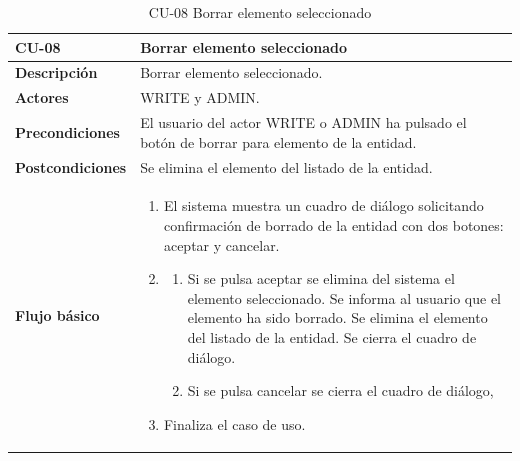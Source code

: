 \begin{table} [H]
    \centering
    \setlength{\leftmargini}{0.4cm}
	\resizebox{14cm}{!} { %
    \begin{tabular}{| m{3cm} | m{11cm} |}   
    \hline
	  \textbf{CU-08} & \textbf{Borrar elemento seleccionado} \\\hline
	  \textbf{Descripción} & Borrar elemento seleccionado. \\\hline
	  \textbf{Actores} & WRITE y ADMIN. \\\hline
	  \textbf{Precondiciones} & El usuario del actor WRITE o ADMIN ha pulsado el botón de borrar para elemento de la entidad. \\\hline
	  \textbf{Postcondiciones} & Se elimina el elemento del listado de la entidad. \\\hline
	  \textbf{Flujo básico} & 
		\begin{enumerate}
	  	\item El sistema muestra un cuadro de diálogo solicitando confirmación de borrado de la entidad con dos botones: aceptar y cancelar.
		\item
			   \begin{enumerate}	
			        \item Si se pulsa aceptar se elimina del sistema el elemento seleccionado. Se informa al usuario que el elemento ha sido borrado. Se elimina el elemento del listado de la entidad. Se cierra el cuadro de diálogo.
			        \item Si se pulsa cancelar se cierra el cuadro de diálogo,
			   \end{enumerate}
	  \item Finaliza el caso de uso.
	  \end{enumerate} 	  	  
	  \\\hline
    \end{tabular}
    } %
    \caption{CU-08 Borrar elemento seleccionado}
    \label{tab:cu-borrar-elemento}
\end{table}



